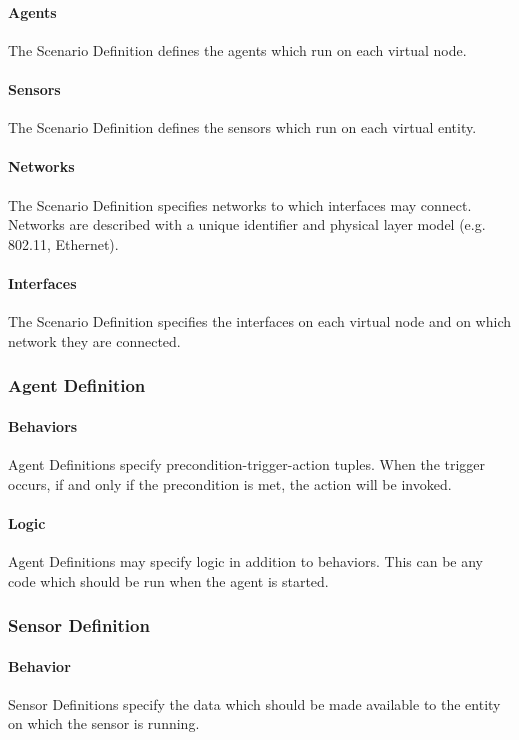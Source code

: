 \documentclass[titlepage]{article}
\begin{document}
    \paragraph{Agents} The Scenario Definition defines the agents which run on each virtual node.
    \paragraph{Sensors} The Scenario Definition defines the sensors which run on each virtual entity.
	\paragraph{Networks} The Scenario Definition specifies networks to which interfaces may connect.  Networks are described with a unique identifier and physical layer model (e.g. 802.11, Ethernet).
	\paragraph{Interfaces} The Scenario Definition specifies the interfaces on each virtual node and on which network they are connected.

\subsubsection{Agent Definition}
    \paragraph{Behaviors} Agent Definitions specify precondition-trigger-action tuples.  When the trigger occurs, if and only if the precondition is met, the action will be invoked.
    \paragraph{Logic} Agent Definitions may specify logic in addition to behaviors.  This can be any code which should be run when the agent is started.

\subsubsection{Sensor Definition}
    \paragraph{Behavior} Sensor Definitions specify the data which should be made available to the entity on which the sensor is running.
\end{document}
